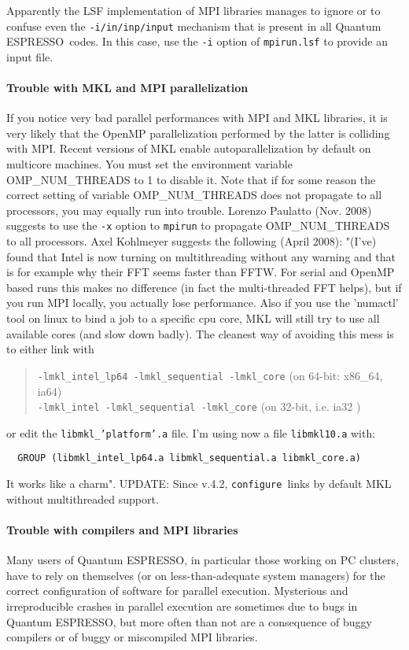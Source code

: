 \documentclass[12pt,a4paper]{article}
\def\qe{{\sc Quantum ESPRESSO}}
\def\configure{\texttt{configure}}
\begin{document}
Apparently the LSF implementation of MPI libraries manages to ignore or to
confuse even the \texttt{-i/in/inp/input} mechanism that is present in all
\qe\ codes. In this case, use the \texttt{-i} option of \texttt{mpirun.lsf}
to provide an input file.

\paragraph{Trouble with MKL and MPI parallelization}
If you notice very bad parallel performances with MPI and MKL libraries,
it is very likely that the OpenMP parallelization performed by the latter
is colliding with MPI. Recent versions of MKL enable autoparallelization
by default on multicore machines.  You must set the environment variable
OMP\_NUM\_THREADS to 1 to disable it.
Note that if for some reason the correct setting  of variable
OMP\_NUM\_THREADS
does not propagate to all processors, you may equally run into trouble.
Lorenzo Paulatto (Nov. 2008) suggests to use the \texttt{-x} option to \texttt{mpirun} to
propagate OMP\_NUM\_THREADS to all processors.
Axel Kohlmeyer suggests the following (April 2008):
"(I've) found that Intel is now turning on multithreading without any
warning and that is for example why their FFT seems faster than
FFTW. For serial and OpenMP based runs this makes no difference (in
fact the multi-threaded FFT helps), but if you run MPI locally, you
actually lose performance. Also if you use the 'numactl' tool on linux
to bind a job to a specific cpu core, MKL will still try to use all
available cores (and slow down badly). The cleanest way of avoiding
this mess is to either link with
\begin{quote}
\texttt{-lmkl\_intel\_lp64 -lmkl\_sequential -lmkl\_core} (on 64-bit:
x86\_64, ia64)\\
\texttt{-lmkl\_intel -lmkl\_sequential -lmkl\_core} (on 32-bit, i.e. ia32 )
\end{quote}
or edit the \texttt{libmkl\_'platform'.a} file. I'm using now a file
\texttt{libmkl10.a} with:
\begin{verbatim}
  GROUP (libmkl_intel_lp64.a libmkl_sequential.a libmkl_core.a)
\end{verbatim}
It works like a charm". UPDATE: Since v.4.2, \configure\ links by
default MKL without multithreaded support.

\paragraph{Trouble with compilers and MPI libraries}
Many users of \qe, in particular those working on PC clusters,
have to rely on themselves (or on less-than-adequate system managers) for
the correct configuration of software for parallel execution. Mysterious and
irreproducible crashes in parallel execution are sometimes due to bugs
in \qe, but more often than not are a consequence of buggy
compilers or of buggy or miscompiled MPI libraries.
\end{document}
